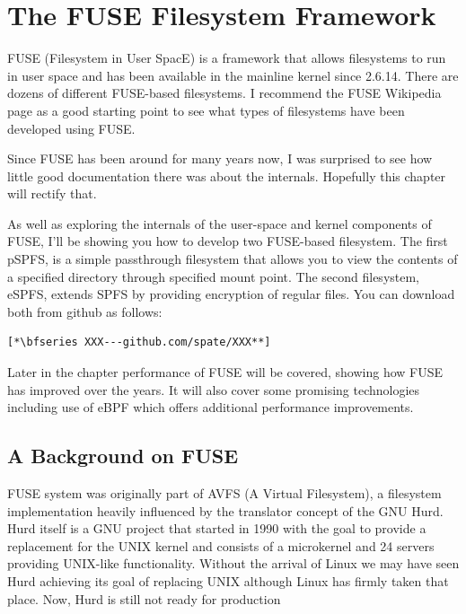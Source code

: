 \chapter{The FUSE Filesystem Framework}\label{fuse-chapter}


FUSE (Filesystem in User SpacE) is a framework that allows filesystems to run in user space and has been available in the mainline kernel since 2.6.14. There are dozens of different FUSE-based filesystems. I recommend the FUSE Wikipedia page as a good starting point to see what types of filesystems have been developed using  FUSE.

Since FUSE has been around for many years now, I was surprised to see how little good documentation there was about the internals. Hopefully this chapter will rectify that.

As well as exploring the internals of the user-space and kernel components of FUSE, I'll be showing you how to develop two FUSE-based filesystem. The first pSPFS, is a simple passthrough filesystem that allows you to view the contents of a specified directory through specified mount point. The second filesystem, eSPFS, extends SPFS by providing encryption of regular files. You can download both from github as follows:

\begin{lstlisting}
[*\bfseries XXX---github.com/spate/XXX**]
\end{lstlisting}

\noindent
Later in the chapter performance of FUSE will be covered, showing how FUSE has improved over the years. It will also cover some promising technologies including use of eBPF which offers additional performance improvements.

\section{A Background on FUSE}

FUSE system was originally part of AVFS (A Virtual Filesystem), a filesystem implementation heavily influenced by the translator concept of the GNU Hurd. Hurd itself is a GNU project that started in 1990 with the goal to provide a replacement for the UNIX kernel and consists of a microkernel and 24 servers providing UNIX-like functionality. Without the arrival of Linux we may have seen Hurd achieving its goal of replacing UNIX although Linux has firmly taken that place. Now, Hurd is still not ready for production

